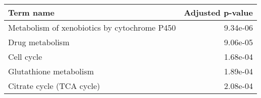 \begin{tabular}{lr}
\toprule
                                    Term name &  Adjusted p-value \\
\midrule
 Metabolism of xenobiotics by cytochrome P450 &          9.34e-06 \\
                              Drug metabolism &          9.06e-05 \\
                                   Cell cycle &          1.68e-04 \\
                       Glutathione metabolism &          1.89e-04 \\
                    Citrate cycle (TCA cycle) &          2.08e-04 \\
\bottomrule
\end{tabular}
